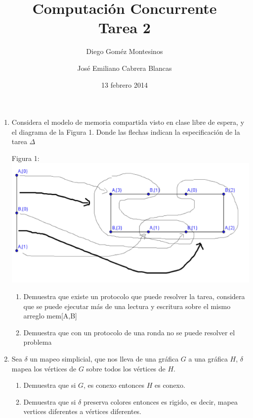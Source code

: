 \documentclass{article}
\title{Computación Concurrente \\ \Large{Tarea 2}}
\author{
  Diego Goméz Montesinos
  \and
  José Emiliano Cabrera Blancas
  }
\date{13 febrero 2014}
\begin{document}
\maketitle
\begin{enumerate}
\item{
    Considera el modelo de memoria compartida visto en clase libre de espera, 
    y el diagrama de la Figura 1. Donde las flechas indican la especificación
    de la tarea $\Delta$
  
    \begin{center}
      Figura 1:\\
      \includegraphics[scale=0.65]{Figura1.png}
    \end{center}

    \begin{enumerate}
      \item{Demuestra que existe un protocolo que puede resolver la tarea,
        considera que se puede ejecutar más de una lectura y escritura sobre
        el mismo arreglo mem[A,B]}
      \item{Demuestra que con un protocolo de una ronda no se puede resolver el 
          problema}
    \end{enumerate}
  }

\item{
    Sea $\delta$ un mapeo simplicial, que nos lleva de una gráfica $G$ a una
    gráfica $H$, $\delta$ mapea los vértices de $G$ sobre todos los vértices de
    $H$.
    \begin{enumerate}
      \item{Demuestra que si $G$, es conexo entonces $H$ es conexo.}
      \item{Demuestra que si $\delta$ preserva colores entonces es rigido, es
        decir, mapea vertices diferentes a vértices diferentes.}
    \end{enumerate}
  }


\end{enumerate}
\end{document}
